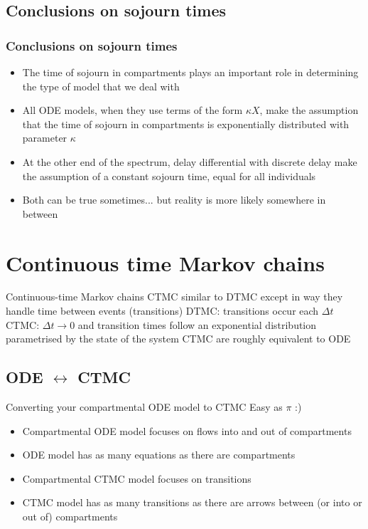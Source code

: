\documentclass[aspectratio=169]{beamer}\usepackage[]{graphicx}\usepackage[]{xcolor}
\begin{document}
\subsection{Conclusions on sojourn times}

\begin{frame}\frametitle{Conclusions on sojourn times}
\begin{itemize}
\item The time of sojourn in compartments plays an important role in determining the type of model that we deal with
\vfill
\item All ODE models, when they use terms of the form $\kappa X$, make the assumption that the time of sojourn in compartments is exponentially distributed with parameter $\kappa$
\vfill
\item At the other end of the spectrum, delay differential with discrete delay make the assumption of a constant sojourn time, equal for all individuals
\vfill
\item Both can be true sometimes... but reality is more likely somewhere in between
\end{itemize}
\end{frame}



\section{Continuous time Markov chains}

\begin{frame}{Continuous-time Markov chains}
    CTMC similar to DTMC except in way they handle time between events (transitions)
\vfill
    DTMC: transitions occur each $\Delta t$
   \vfill 
    CTMC: $\Delta t\to 0$ and transition times follow an exponential distribution parametrised by the state of the system
    \vfill
    CTMC are roughly equivalent to ODE    
\end{frame}


\subsection{ODE $\leftrightarrow$ CTMC}

\begin{frame}{Converting your compartmental ODE model to CTMC}
    Easy as $\pi$ :)
\vfill
\begin{itemize}
    \item Compartmental ODE model focuses on flows into and out of compartments
    \vfill
    \item ODE model has as many equations as there are compartments
    \vfill
    \item Compartmental CTMC model focuses on transitions
    \vfill
    \item CTMC model has as many transitions as there are arrows between (or into or out of) compartments
\end{itemize}
\end{frame}
\end{document}
